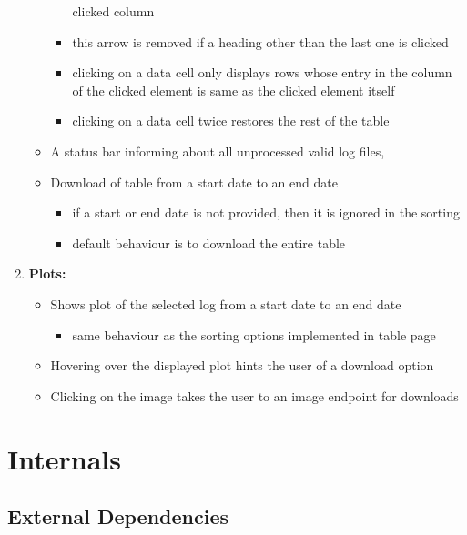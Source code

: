 \documentclass[11pt]{scrartcl}
\begin{document}
\begin{enumerate}
\begin{itemize}
\begin{itemize}
        clicked column
      \item this arrow is removed if a heading other than the last one is clicked
      \item clicking on a data cell only displays rows whose entry in the column
        of the clicked element is same as the clicked element itself
      \item clicking on a data cell twice restores the rest of the table
    \end{itemize}
    \item A status bar informing about all unprocessed valid log files,
    \item Download of table from a start date to an end date
    \begin{itemize}
      \item if a start or end date is not provided, then it is ignored in the
        sorting
      \item default behaviour is to download the entire table
    \end{itemize}

    \end{itemize}
  \item \textbf{Plots:}
  \begin{itemize}
    \item Shows plot of the selected log from a start date to an end date
    \begin{itemize}
      \item same behaviour as the sorting options implemented in table page
    \end{itemize}
    \item Hovering over the displayed plot hints the user of a download option
    \item Clicking on the image takes the user to an image endpoint for downloads
  \end{itemize}

\end{enumerate}


\newpage 

\section{Internals}
\label{section:internals}

\subsection{External Dependencies}
\end{document}
